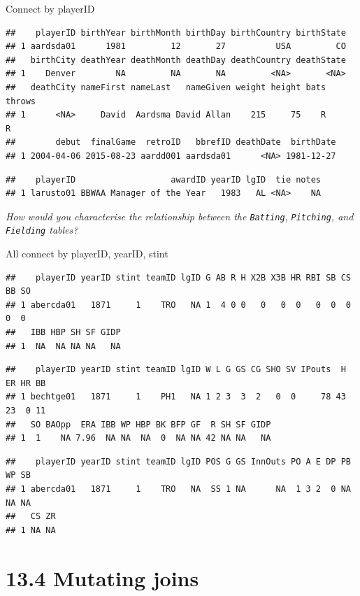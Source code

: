 \documentclass[]{book}
\theoremstyle{definition}
\theoremstyle{definition}
\theoremstyle{definition}
\theoremstyle{remark}
\begin{document}
\begin{enumerate}
  Connect by playerID

\begin{verbatim}
##    playerID birthYear birthMonth birthDay birthCountry birthState
## 1 aardsda01      1981         12       27          USA         CO
##   birthCity deathYear deathMonth deathDay deathCountry deathState
## 1    Denver        NA         NA       NA         <NA>       <NA>
##   deathCity nameFirst nameLast   nameGiven weight height bats throws
## 1      <NA>     David  Aardsma David Allan    215     75    R      R
##        debut  finalGame  retroID   bbrefID deathDate  birthDate
## 1 2004-04-06 2015-08-23 aardd001 aardsda01      <NA> 1981-12-27
\end{verbatim}

\begin{verbatim}
##    playerID                   awardID yearID lgID  tie notes
## 1 larusto01 BBWAA Manager of the Year   1983   AL <NA>    NA
\end{verbatim}

  \emph{How would you characterise the relationship between the
  \texttt{Batting},} \emph{\texttt{Pitching}, and \texttt{Fielding}
  tables?}

  All connect by playerID, yearID, stint

\begin{verbatim}
##    playerID yearID stint teamID lgID G AB R H X2B X3B HR RBI SB CS BB SO
## 1 abercda01   1871     1    TRO   NA 1  4 0 0   0   0  0   0  0  0  0  0
##   IBB HBP SH SF GIDP
## 1  NA  NA NA NA   NA
\end{verbatim}

\begin{verbatim}
##    playerID yearID stint teamID lgID W L G GS CG SHO SV IPouts  H ER HR BB
## 1 bechtge01   1871     1    PH1   NA 1 2 3  3  2   0  0     78 43 23  0 11
##   SO BAOpp  ERA IBB WP HBP BK BFP GF  R SH SF GIDP
## 1  1    NA 7.96  NA NA  NA  0  NA NA 42 NA NA   NA
\end{verbatim}

\begin{verbatim}
##    playerID yearID stint teamID lgID POS G GS InnOuts PO A E DP PB WP SB
## 1 abercda01   1871     1    TRO   NA  SS 1 NA      NA  1 3 2  0 NA NA NA
##   CS ZR
## 1 NA NA
\end{verbatim}
\end{enumerate}

\hypertarget{mutating-joins}{%
\section{13.4 Mutating joins}\label{mutating-joins}}
\end{document}
